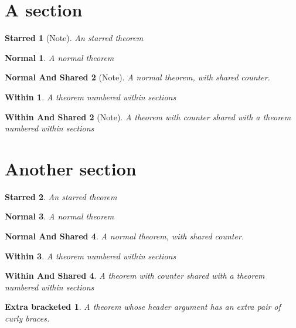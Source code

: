 \documentclass{article}
\theoremstyle{redPlain}
\newtheorem*{starred}{Starred}
\newtheorem{normal}{Normal}
\newtheorem{normalshared}[normal]{Normal And Shared}
\theoremstyle{plain}
\newtheorem{within}{Within}[section]
\newtheorem{withinshared}[within]{Within And Shared}
\newtheorem{extrabracketed}{{Extra bracketed}}
\begin{document}
\section{A section}
\begin{starred}[Note]
    An starred theorem
\end{starred}
\begin{normal}
    A normal theorem
\end{normal}
\begin{normalshared}[Note]
    A normal theorem, with shared counter.
\end{normalshared}
\begin{within}
    A theorem numbered within sections
\end{within}
\begin{withinshared}[Note]
    A theorem with counter shared with a theorem numbered within sections
\end{withinshared}
\section{Another section}
\begin{starred}
    An starred theorem
\end{starred}
\begin{normal}
    A normal theorem
\end{normal}
\begin{normalshared}
    A normal theorem, with shared counter.
\end{normalshared}
\begin{within}
    A theorem numbered within sections
\end{within}
\begin{withinshared}\label{T:1}
    A theorem with counter shared with a theorem numbered within sections
\end{withinshared}

\begin{extrabracketed}
    A theorem whose header argument has an extra pair of curly braces.
\end{extrabracketed}
\end{document}
